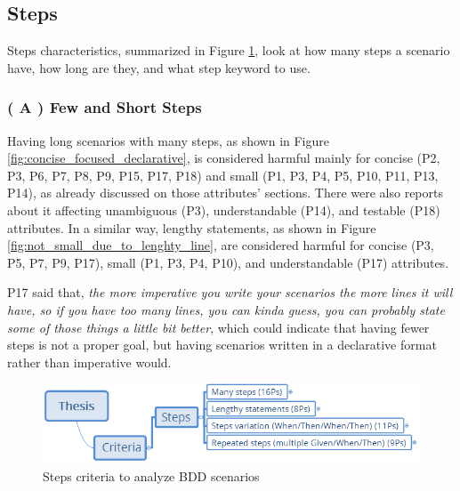 
\subsection{Steps}

Steps characteristics, summarized in Figure \ref{fig:steps_criteria}, look at how many steps a scenario have, how long are they, and what step keyword to use.


\subsubsection{\textbf{( A ) Few and Short Steps}}

Having long scenarios with many steps, as shown in Figure \ref{fig:concise_focused_declarative}, is considered harmful mainly for concise (P2, P3, P6, P7, P8, P9, P15, P17, P18) and small (P1, P3, P4, P5, P10, P11, P13, P14), as already discussed on those attributes' sections. There were also reports about it affecting unambiguous (P3), understandable (P14), and testable (P18) attributes. In a similar way, lengthy statements, as shown in Figure \ref{fig:not_small_due_to_lenghty_line}, are considered harmful for concise (P3, P5, P7, P9, P17), small (P1, P3, P4, P10), and understandable (P17) attributes.

P17 said that, \textit{the more imperative you write your scenarios the more lines it will have, so if you have too many lines, you can kinda guess, you can probably state some of those things a little bit better}, which could indicate that having fewer steps is not a proper goal, but having scenarios written in a declarative format rather than imperative would. 

\begin{figure}[t]
	\centering
	\includegraphics[scale=0.8]{images/steps_criteria}
	\caption[\hspace{2mm}Steps criteria to analyze BDD scenarios]{Steps criteria to analyze BDD scenarios}
	\label{fig:steps_criteria}
\end{figure}


